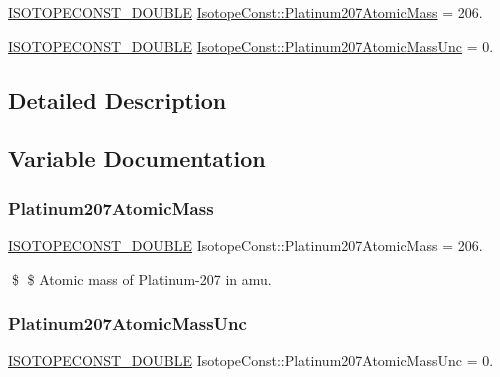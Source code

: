 \begin{DoxyCompactItemize}
\item 
\mbox{\hyperlink{group___isotope_const-_macros_ga8f45a7272ce02c0b4c65c44636ed719a}{I\+S\+O\+T\+O\+P\+E\+C\+O\+N\+S\+T\+\_\+\+D\+O\+U\+B\+LE}} \mbox{\hyperlink{group___isotope_const-_platinum-_pt207_gacb6c910c00a42146f78fd30696b8f0b4}{Isotope\+Const\+::\+Platinum207\+Atomic\+Mass}} = 206.
\item 
\mbox{\hyperlink{group___isotope_const-_macros_ga8f45a7272ce02c0b4c65c44636ed719a}{I\+S\+O\+T\+O\+P\+E\+C\+O\+N\+S\+T\+\_\+\+D\+O\+U\+B\+LE}} \mbox{\hyperlink{group___isotope_const-_platinum-_pt207_gaff88c7243e044ff85473641ff440b577}{Isotope\+Const\+::\+Platinum207\+Atomic\+Mass\+Unc}} = 0.
\end{DoxyCompactItemize}


\subsection{Detailed Description}


\subsection{Variable Documentation}
\mbox{\label{group___isotope_const-_platinum-_pt207_gacb6c910c00a42146f78fd30696b8f0b4}} 
\subsubsection{\texorpdfstring{Platinum207\+Atomic\+Mass}{Platinum207AtomicMass}}
{\footnotesize\ttfamily \mbox{\hyperlink{group___isotope_const-_macros_ga8f45a7272ce02c0b4c65c44636ed719a}{I\+S\+O\+T\+O\+P\+E\+C\+O\+N\+S\+T\+\_\+\+D\+O\+U\+B\+LE}} Isotope\+Const\+::\+Platinum207\+Atomic\+Mass = 206.}

\$ \$ Atomic mass of Platinum-\/207 in amu. \mbox{\label{group___isotope_const-_platinum-_pt207_gaff88c7243e044ff85473641ff440b577}} 
\subsubsection{\texorpdfstring{Platinum207\+Atomic\+Mass\+Unc}{Platinum207AtomicMassUnc}}
{\footnotesize\ttfamily \mbox{\hyperlink{group___isotope_const-_macros_ga8f45a7272ce02c0b4c65c44636ed719a}{I\+S\+O\+T\+O\+P\+E\+C\+O\+N\+S\+T\+\_\+\+D\+O\+U\+B\+LE}} Isotope\+Const\+::\+Platinum207\+Atomic\+Mass\+Unc = 0.}

